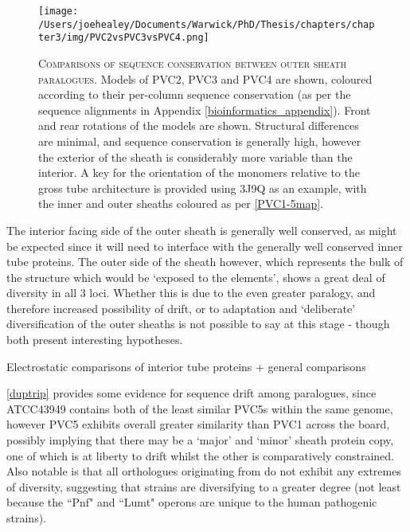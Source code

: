 \begin{figure}[h]
 \thispagestyle{augment}
 \centering
 \texttt{[image: /Users/joehealey/Documents/Warwick/PhD/Thesis/chapters/chapter3/img/PVC2vsPVC3vsPVC4.png]}
 \captionsetup{singlelinecheck=off, justification=justified, font=footnotesize, aboveskip=10pt}
 \caption[PVC2, PVC3 and PVC4 paralogue conservation comparison]{\textsc{\normalsize Comparisons of sequence conservation between outer sheath paralogues.}\vspace{0.1cm} \newline Models of PVC2, PVC3 and PVC4 are shown, coloured according to their per-column sequence conservation (as per the sequence alignments in Appendix \ref{bioinformatics_appendix}). Front and rear rotations of the models are shown. Structural differences are minimal, and sequence conservation is generally high, however the exterior of the sheath is considerably more variable than the interior. A key for the orientation of the monomers relative to the gross tube architecture is provided using 3J9Q as an example, with the inner and outer sheaths coloured as per \vref{PVC1-5map}.}
	\label{PVC2vsPVC4vsPVC5}
\end{figure}

The interior facing side of the outer sheath is generally well conserved, as might be expected since it will need to interface with the generally well conserved inner tube proteins. The outer side of the sheath however, which represents the bulk of the structure which would be `exposed to the elements', shows a great deal of diversity in all 3 loci. Whether this is due to the even greater paralogy, and therefore increased possibility of drift, or to adaptation and `deliberate' diversification of the outer sheaths is not possible to say at this stage - though both present interesting hypotheses.


Electrostatic comparisons of interior tube proteins + general comparisons

\vref{duptrip} provides some evidence for sequence drift among paralogues, since \Pasy{} ATCC43949 contains both of the least similar PVC5s within the same genome, however PVC5 exhibits overall greater similarity than PVC1 across the board, possibly implying that there may be a `major' and `minor' sheath protein copy, one of which is at liberty to drift whilst the other is comparatively constrained. Also notable is that all orthologues originating from \Plum{} do not exhibit any extremes of diversity, suggesting that \Pasy{} strains are diversifying to a greater degree (not least because the ``Pnf" and ``Lumt" operons are unique to the human pathogenic strains).

